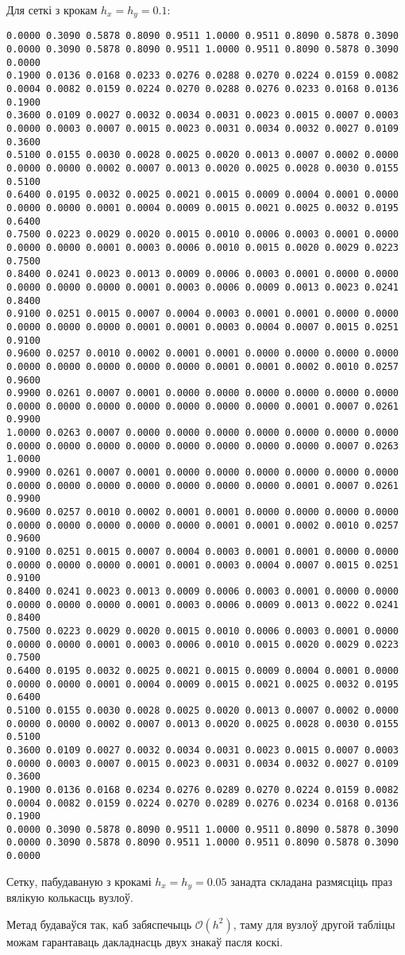 Для сеткі з крокам $h_x = h_y = 0.1$:
{\tiny
\begin{verbatim}
0.0000 0.3090 0.5878 0.8090 0.9511 1.0000 0.9511 0.8090 0.5878 0.3090 0.0000 0.3090 0.5878 0.8090 0.9511 1.0000 0.9511 0.8090 0.5878 0.3090 0.0000
0.1900 0.0136 0.0168 0.0233 0.0276 0.0288 0.0270 0.0224 0.0159 0.0082 0.0004 0.0082 0.0159 0.0224 0.0270 0.0288 0.0276 0.0233 0.0168 0.0136 0.1900
0.3600 0.0109 0.0027 0.0032 0.0034 0.0031 0.0023 0.0015 0.0007 0.0003 0.0000 0.0003 0.0007 0.0015 0.0023 0.0031 0.0034 0.0032 0.0027 0.0109 0.3600
0.5100 0.0155 0.0030 0.0028 0.0025 0.0020 0.0013 0.0007 0.0002 0.0000 0.0000 0.0000 0.0002 0.0007 0.0013 0.0020 0.0025 0.0028 0.0030 0.0155 0.5100
0.6400 0.0195 0.0032 0.0025 0.0021 0.0015 0.0009 0.0004 0.0001 0.0000 0.0000 0.0000 0.0001 0.0004 0.0009 0.0015 0.0021 0.0025 0.0032 0.0195 0.6400
0.7500 0.0223 0.0029 0.0020 0.0015 0.0010 0.0006 0.0003 0.0001 0.0000 0.0000 0.0000 0.0001 0.0003 0.0006 0.0010 0.0015 0.0020 0.0029 0.0223 0.7500
0.8400 0.0241 0.0023 0.0013 0.0009 0.0006 0.0003 0.0001 0.0000 0.0000 0.0000 0.0000 0.0000 0.0001 0.0003 0.0006 0.0009 0.0013 0.0023 0.0241 0.8400
0.9100 0.0251 0.0015 0.0007 0.0004 0.0003 0.0001 0.0001 0.0000 0.0000 0.0000 0.0000 0.0000 0.0001 0.0001 0.0003 0.0004 0.0007 0.0015 0.0251 0.9100
0.9600 0.0257 0.0010 0.0002 0.0001 0.0001 0.0000 0.0000 0.0000 0.0000 0.0000 0.0000 0.0000 0.0000 0.0000 0.0001 0.0001 0.0002 0.0010 0.0257 0.9600
0.9900 0.0261 0.0007 0.0001 0.0000 0.0000 0.0000 0.0000 0.0000 0.0000 0.0000 0.0000 0.0000 0.0000 0.0000 0.0000 0.0000 0.0001 0.0007 0.0261 0.9900
1.0000 0.0263 0.0007 0.0000 0.0000 0.0000 0.0000 0.0000 0.0000 0.0000 0.0000 0.0000 0.0000 0.0000 0.0000 0.0000 0.0000 0.0000 0.0007 0.0263 1.0000
0.9900 0.0261 0.0007 0.0001 0.0000 0.0000 0.0000 0.0000 0.0000 0.0000 0.0000 0.0000 0.0000 0.0000 0.0000 0.0000 0.0000 0.0001 0.0007 0.0261 0.9900
0.9600 0.0257 0.0010 0.0002 0.0001 0.0001 0.0000 0.0000 0.0000 0.0000 0.0000 0.0000 0.0000 0.0000 0.0000 0.0001 0.0001 0.0002 0.0010 0.0257 0.9600
0.9100 0.0251 0.0015 0.0007 0.0004 0.0003 0.0001 0.0001 0.0000 0.0000 0.0000 0.0000 0.0000 0.0001 0.0001 0.0003 0.0004 0.0007 0.0015 0.0251 0.9100
0.8400 0.0241 0.0023 0.0013 0.0009 0.0006 0.0003 0.0001 0.0000 0.0000 0.0000 0.0000 0.0000 0.0001 0.0003 0.0006 0.0009 0.0013 0.0022 0.0241 0.8400
0.7500 0.0223 0.0029 0.0020 0.0015 0.0010 0.0006 0.0003 0.0001 0.0000 0.0000 0.0000 0.0001 0.0003 0.0006 0.0010 0.0015 0.0020 0.0029 0.0223 0.7500
0.6400 0.0195 0.0032 0.0025 0.0021 0.0015 0.0009 0.0004 0.0001 0.0000 0.0000 0.0000 0.0001 0.0004 0.0009 0.0015 0.0021 0.0025 0.0032 0.0195 0.6400
0.5100 0.0155 0.0030 0.0028 0.0025 0.0020 0.0013 0.0007 0.0002 0.0000 0.0000 0.0000 0.0002 0.0007 0.0013 0.0020 0.0025 0.0028 0.0030 0.0155 0.5100
0.3600 0.0109 0.0027 0.0032 0.0034 0.0031 0.0023 0.0015 0.0007 0.0003 0.0000 0.0003 0.0007 0.0015 0.0023 0.0031 0.0034 0.0032 0.0027 0.0109 0.3600
0.1900 0.0136 0.0168 0.0234 0.0276 0.0289 0.0270 0.0224 0.0159 0.0082 0.0004 0.0082 0.0159 0.0224 0.0270 0.0289 0.0276 0.0234 0.0168 0.0136 0.1900
0.0000 0.3090 0.5878 0.8090 0.9511 1.0000 0.9511 0.8090 0.5878 0.3090 0.0000 0.3090 0.5878 0.8090 0.9511 1.0000 0.9511 0.8090 0.5878 0.3090 0.0000
\end{verbatim}
}

Сетку, пабудаваную з крокамі $h_x = h_y = 0.05$ занадта складана размясціць праз вялікую колькасць вузлоў.\par

Метад будаваўся так, каб забяспечыць $\mathcal{O}(h^2)$, таму для вузлоў другой табліцы можам гарантаваць дакладнасць двух знакаў пасля коскі.
